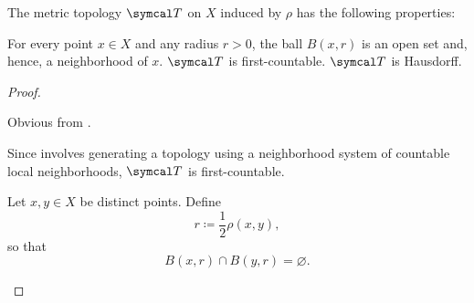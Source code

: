 \begin{proposition}\label{thm:metric_topology_properties}
  The metric topology \( \Cal{T} \) on \( X \) induced by \( \rho \) has the following properties:
  \begin{defenum}
     For every point \( x \in X \) and any radius \( r > 0 \), the ball \( B(x, r) \) is an open set and, hence, a neighborhood of \( x \).
     \( \Cal{T} \) is first-countable.
     \( \Cal{T} \) is Hausdorff.
  \end{defenum}
\end{proposition}
\begin{proof}\mbox{}
  \begin{description}
     Obvious from .

     Since  involves generating a topology using a neighborhood system of countable local neighborhoods, \( \Cal{T} \) is first-countable.

     Let \( x, y \in X \) be distinct points. Define
    \begin{equation*}
      r \coloneqq \dfrac 1 2 \rho(x, y),
    \end{equation*}
    so that
    \begin{equation*}
      B(x, r) \cap B(y, r) = \varnothing.
    \end{equation*}
  \end{description}
\end{proof}


